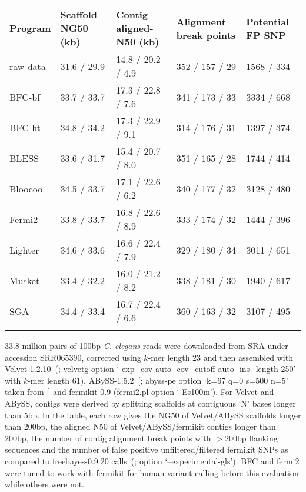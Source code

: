 \documentclass{bioinfo}
\begin{document}
\begin{table}[b]
{\footnotesize
\begin{tabular}{p{1.0cm}p{1.3cm}p{1.9cm}p{1.5cm}p{1.2cm}}
\toprule
Program   & Scaffold NG50 (kb) & Contig aligned-N50 (kb) & Alignment break points & Potential FP SNP\\
\midrule
raw data  & 31.6 / 29.9 & 14.8 / 20.2 / 4.9 & 352 / 157 / 29 & 1568 / 334\\
BFC-bf    & 33.7 / 33.7 & 17.3 / 22.8 / 7.6 & 341 / 173 / 33 & 3334 / 668\\
BFC-ht    & 34.8 / 34.2 & 17.3 / 22.9 / 9.1 & 314 / 176 / 31 & 1397 / 374\\
BLESS     & 33.6 / 31.7 & 15.4 / 20.7 / 8.0 & 351 / 165 / 28 & 1744 / 414\\
Bloocoo   & 34.5 / 33.7 & 17.1 / 22.6 / 6.2 & 340 / 177 / 32 & 3128 / 480\\
Fermi2    & 33.8 / 33.7 & 16.8 / 22.6 / 8.9 & 333 / 174 / 32 & 1444 / 396\\
Lighter   & 34.6 / 33.6 & 16.6 / 22.4 / 7.9 & 329 / 180 / 34 & 3011 / 651\\
Musket    & 33.4 / 32.2 & 16.0 / 21.2 / 8.2 & 338 / 181 / 30 & 1940 / 617\\
SGA       & 34.4 / 33.4 & 16.7 / 22.4 / 6.6 & 360 / 163 / 32 & 3107 / 495\\
\botrule
\end{tabular}}{33.8 million pairs of 100bp {\it C. elegans} reads were
downloaded from SRA under accession SRR065390, corrected using $k$-mer length
23 and then assembled with Velvet-1.2.10~(\citealp{Zerbino:2008uq}; velvetg
option `\mbox{-exp\_cov} auto \mbox{-cov\_cutoff} auto \mbox{-ins\_length} 250'
with $k$-mer length 61), ABySS-1.5.2~[\citealp{Simpson:2009ys}; abyss-pe
option `k=67 q=0 s=500 n=5' taken from~\citet{Simpson:2012aa}] and fermikit-0.9
(fermi2.pl option \mbox{`-Es100m'}). For Velvet and ABySS, contigs were derived
by splitting scaffolds at contiguous `N' bases longer than 5bp. In the table,
each row gives the NG50 of Velvet/ABySS scaffolds longer than 200bp, the
aligned N50 of Velvet/ABySS/fermikit contigs longer than 200bp, the number of
contig alignment break points with $>$200bp flanking sequences and the number
of false positive unfiltered/filtered fermikit SNPs as compared to
freebayes-0.9.20 calls~(\citealp{Garrison:2012aa}; option
`\mbox{--experimental-gls}'). BFC and fermi2 were tuned to work with fermikit
for human variant calling before this evaluation while others were not.}
\end{table}
\end{document}

